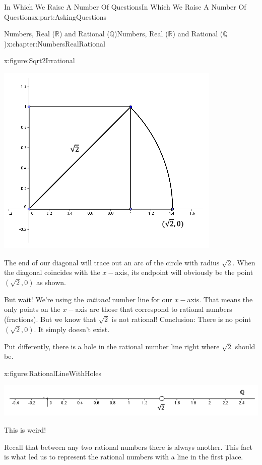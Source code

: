 \documentclass[oneside,10pt,]{book}
\numberwithin{equation}{section}
\newcommand{\RR}{\mathbb {R}}
\newcommand{\QQ}{\mathbb {Q}}
\begin{document}
\begin{partptx}{In Which We Raise A Number Of Questions}{}{In Which We Raise A Number Of Questions}{}{}{x:part:AskingQuestions}
\begin{chapterptx}{Numbers, Real (\(\RR\)) and Rational (\(\QQ\))}{}{Numbers, Real (\(\RR\)) and Rational (\(\QQ\))}{}{}{x:chapter:NumbersRealRational}
\begin{introduction}{}
\begin{figureptx}{}{x:figure:Sqrt2Irrational}{}
\begin{image}{0.25}{0.5}{0.25}
\includegraphics[width=\linewidth]{images/Sqrt2Irrational.png}
\end{image}%
\tcblower
\end{figureptx}%
The end of our diagonal will trace out an arc of the circle with radius \(\sqrt{2}\). When the diagonal coincides with the \(x-\)axis, its endpoint will obviously be the point \((\sqrt{2}, 0)\) as shown.%
\par
But wait! We're using the \emph{rational} number line for our \(x-\)axis. That means the only points on the \(x-\)axis are those that correspond to rational numbers (fractions). But we know that \(\sqrt{2}\) is not rational! Conclusion: There is no point \((\sqrt{2},0)\). It simply doesn't exist.%
\par
Put differently, there is a hole in the rational number line right where \(\sqrt{2}\) should be.%
\begin{figureptx}{}{x:figure:RationalLineWithHoles}{}%
\begin{image}{0}{1}{0}%
\includegraphics[width=\linewidth]{images/RationalLineWithHoles.png}
\end{image}%
\tcblower
\end{figureptx}%
This is weird!%
\par
Recall that between any two rational numbers there is always another. This fact is what led us to represent the rational numbers with a line in the first place.%

\end{introduction}
\end{chapterptx}
\end{partptx}
\end{document}
